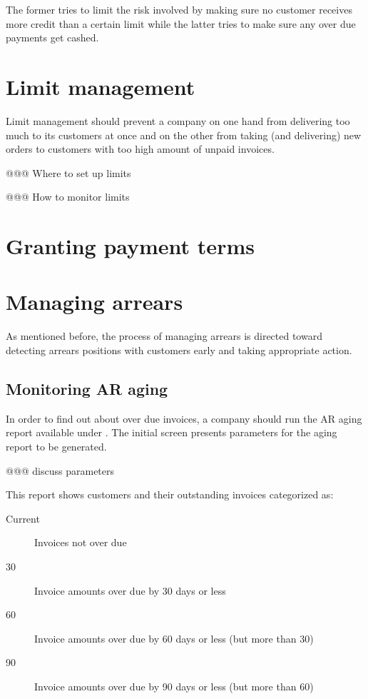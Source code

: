 The former tries to limit the risk involved by making sure no \gls{customer}
receives more credit than a certain limit while the latter tries to
make sure any over due payments get cashed.

\section{Limit management}
\label{sec-business-processes-credit-risk-limit-management}

Limit management should prevent a company on one hand from delivering too much
to its customers at once and on the other from taking (and delivering) new orders
to customers with too high amount of unpaid invoices.



@@@ Where to set up limits

@@@ How to monitor limits



\section{Granting payment terms}
\label{sec-business-processes-credit-risk-payment-terms}

\section{Managing arrears}
\label{sec-business-processes-credit-risk-managing-arrears}

As mentioned before, the process of managing arrears is directed toward
detecting arrears positions with customers early and taking appropriate
action.


\subsection{Monitoring AR aging}
\label{subsec-business-processes-credit-risk-monitoring-arrears}

In order to find out about over due invoices, a company should run the AR
aging report available under .
The initial screen presents parameters for the aging report to be generated.

@@@ discuss parameters

This report shows customers and their outstanding invoices categorized as:

\begin{description}
\item [Current] Invoices not over due
\item [30] Invoice amounts over due by 30 days or less
\item [60] Invoice amounts over due by 60 days or less (but more than 30)
\item [90] Invoice amounts over due by 90 days or less (but more than 60)
\end{description}


